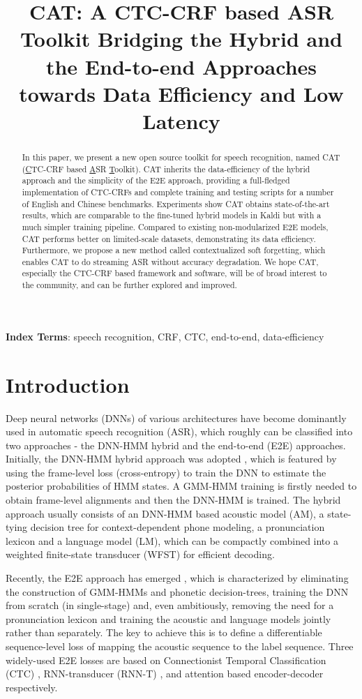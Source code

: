 \documentclass[a4paper]{article}
\title{CAT: A CTC-CRF based ASR Toolkit Bridging the Hybrid and the End-to-end Approaches towards Data Efficiency and Low Latency}
\begin{document}
\maketitle
\begin{abstract}
In this paper, we present a new open source toolkit for speech recognition, named CAT (\underline{C}TC-CRF based \underline{A}SR \underline{T}oolkit). CAT inherits the data-efficiency of the hybrid approach and the simplicity of the E2E approach, providing a full-fledged implementation of CTC-CRFs and complete training and testing scripts for a number of English and Chinese benchmarks. 
Experiments show CAT obtains state-of-the-art results, which are comparable to the fine-tuned hybrid models in Kaldi but with a much simpler training pipeline. Compared to existing non-modularized E2E models, CAT performs better on limited-scale datasets, demonstrating its data efficiency.
Furthermore, we propose a new method called contextualized soft forgetting, which enables CAT to do streaming ASR without accuracy degradation.
We hope CAT, especially the CTC-CRF based framework and software, will be of broad interest to the community, and can be further explored and improved.
\end{abstract}
\noindent\textbf{Index Terms}: speech recognition, CRF, CTC, end-to-end, data-efficiency

\section{Introduction}

Deep neural networks (DNNs) of various architectures have become dominantly used in automatic speech recognition (ASR), which roughly can be classified into two approaches - the DNN-HMM hybrid and the end-to-end (E2E) approaches.
Initially, the DNN-HMM hybrid approach was adopted \cite{dahl2012context}, which is featured by using the frame-level loss (cross-entropy) to train the DNN to estimate the posterior probabilities of HMM states.
A GMM-HMM training is firstly needed to obtain frame-level alignments and then the DNN-HMM is trained.
The hybrid approach usually consists of an DNN-HMM based acoustic model (AM), a state-tying decision tree for context-dependent phone modeling, a pronunciation lexicon and a language model (LM), which can be compactly combined into a weighted finite-state transducer (WFST) \cite{mohri2008speech} for efficient decoding.

Recently, the E2E approach has emerged \cite{graves2006connectionist,Miao2015EESEN,graves2012sequence,chorowski2014end}, which is characterized by eliminating the construction of GMM-HMMs and phonetic decision-trees, training the DNN from scratch (in single-stage) and, even ambitiously, removing the need for a pronunciation lexicon and training the acoustic and language models jointly rather than separately.
The key to achieve this is to define a differentiable sequence-level loss of mapping the acoustic sequence to the label sequence.
Three widely-used E2E losses are based on Connectionist Temporal Classification (CTC) \cite{graves2006connectionist}, RNN-transducer (RNN-T)  \cite{graves2012sequence}, and attention based encoder-decoder \cite{chorowski2014end} respectively.
\end{document}
